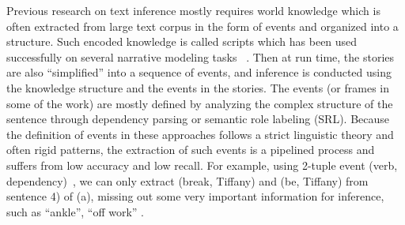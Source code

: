 Previous research on text inference mostly requires world knowledge
which is often extracted from large text corpus in the form of events and
organized into a structure. Such encoded knowledge is called scripts which has been used 
successfully on several narrative modeling tasks ~\cite{ferraro2016unified,orr2014learning,pichotta2016learning,peng2017joint}. 
Then at run time, the stories are also ``simplified'' into
a sequence of events, and inference is conducted using the knowledge structure and
the events in the stories.
The events (or frames in some of the work)
are mostly defined by analyzing the complex structure 
of the sentence through dependency parsing or semantic role labeling (SRL).
Because the definition of events in these approaches follows a 
strict linguistic theory and often rigid patterns, the extraction of
such events is a pipelined process and suffers from low accuracy and
low recall. For example, using 2-tuple event (verb, dependency)~\cite{ostermann2018mcscript}, 
we can only extract (break, Tiffany) and (be, Tiffany) from sentence 4) of (a), missing out some
very important information for inference, such as ``ankle'', ``off work'' .


